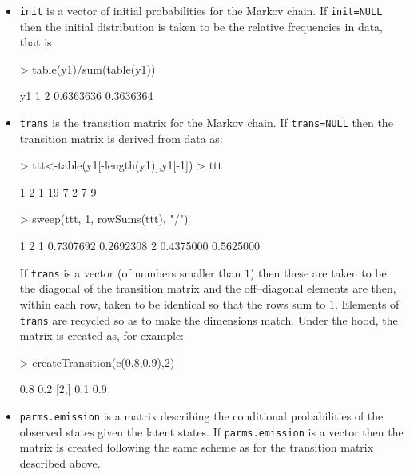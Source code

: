 \documentclass{article}
\def\code#1{\texttt{#1}}
\begin{document}
\begin{itemize}

\item \code{init} is a vector of initial probabilities for the Markov
chain. 
If \code{init=NULL} then the initial distribution is taken to be
the relative frequencies in data, that is
\begin{Schunk}
\begin{Sinput}
> table(y1)/sum(table(y1))
\end{Sinput}
\begin{Soutput}
y1
        1         2 
0.6363636 0.3636364 
\end{Soutput}
\end{Schunk}

\item \code{trans} is the transition matrix for the Markov chain.
If \code{trans=NULL} then the transition matrix is derived from data as:
\begin{Schunk}
\begin{Sinput}
> ttt<-table(y1[-length(y1)],y1[-1])
> ttt
\end{Sinput}
\begin{Soutput}
     1  2
  1 19  7
  2  7  9
\end{Soutput}
\begin{Sinput}
> sweep(ttt, 1, rowSums(ttt), "/")
\end{Sinput}
\begin{Soutput}
            1         2
  1 0.7307692 0.2692308
  2 0.4375000 0.5625000
\end{Soutput}
\end{Schunk}

If \code{trans} is a vector (of numbers smaller than $1$) then these
are taken to be the diagonal of the transition matrix and the
off--diagonal elements are then, within each row, taken to be
identical so that the rows sum to $1$. Elements of \code{trans} are
recycled so as to make the dimensions match. Under the hood, the
matrix is created as, for example:

\begin{Schunk}
\begin{Sinput}
> createTransition(c(0.8,0.9),2)
\end{Sinput}
\begin{Soutput}
     [,1] [,2]
[1,]  0.8  0.2
[2,]  0.1  0.9
\end{Soutput}
\end{Schunk}

\item \code{parms.emission} is a matrix describing the conditional
  probabilities of the observed states given the latent states. If
  \code{parms.emission} is a vector then the matrix is created
  following the same scheme as for the transition matrix described
  above. 



\end{itemize}
\end{document}

